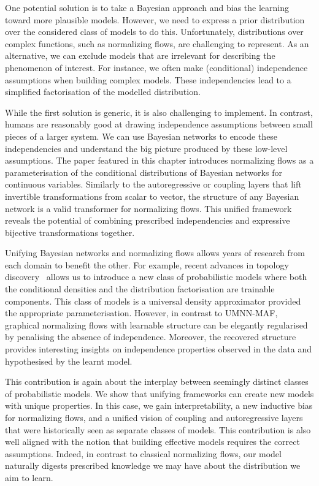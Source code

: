One potential solution is to take a Bayesian approach and bias the learning toward more plausible models. However, we need to express a prior distribution over the considered class of models to do this. Unfortunately, distributions over complex functions, such as normalizing flows, are challenging to represent. As an alternative, we can exclude models that are irrelevant for describing the phenomenon of interest. For instance, we often make (conditional) independence assumptions when building complex models. These independencies lead to a simplified factorisation of the modelled distribution.

While the first solution is generic, it is also challenging to implement. In contrast, humans are reasonably good at drawing independence assumptions between small pieces of a larger system. We can use Bayesian networks to encode these independencies and understand the big picture produced by these low-level assumptions. The paper featured in this chapter introduces normalizing flows as a parameterisation of the conditional distributions of Bayesian networks for continuous variables. Similarly to the autoregressive or coupling layers that lift invertible transformations from scalar to vector, the structure of any Bayesian network is a valid transformer for normalizing flows. This unified framework reveals the potential of combining prescribed independencies and expressive bijective transformations together.

Unifying Bayesian networks and normalizing flows allows years of research from each domain to benefit the other. For example, recent advances in topology discovery~\citep{zheng2018dags} allows us to introduce a new class of probabilistic models where both the conditional densities and the distribution factorisation are trainable components. This class of models is a universal density approximator provided the appropriate parameterisation. However, in contrast to UMNN-MAF, graphical normalizing flows with learnable structure can be elegantly regularised by penalising the absence of independence. Moreover, the recovered structure provides interesting insights on independence properties observed in the data and hypothesised by the learnt model.

This contribution is again about the interplay between seemingly distinct classes of probabilistic models. We show that unifying frameworks can create new models with unique properties. In this case, we gain interpretability, a new inductive bias for normalizing flows, and a unified vision of coupling and autoregressive layers that were historically seen as separate classes of models. This contribution is also well aligned with the notion that building effective models requires the correct assumptions. Indeed, in contrast to classical normalizing flows, our model naturally digests prescribed knowledge we may have about the distribution we aim to learn.


